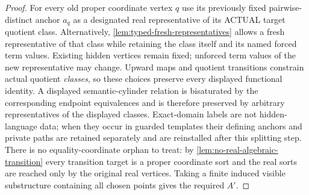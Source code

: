 \begin{proof}
For every old proper coordinate vertex
\(q\) use its previously fixed
pairwise-distinct anchor \(a_q\)
as a designated real representative
of its ACTUAL target quotient class.
Alternatively,
\cref{lem:typed-fresh-representatives}
allows a fresh representative of that class
while retaining the class itself and its
named forced term values. Existing hidden
vertices remain fixed; unforced term values
of the new representative may change.
Upward maps and quotient
transitions constrain actual
quotient \emph{classes}, so these
choices preserve every displayed
functional identity.  A displayed semantic-cylinder relation is bisaturated by the corresponding
endpoint equivalences and is therefore preserved by arbitrary representatives
of the displayed classes.  Exact-domain labels are not hidden-language data;
when they occur in guarded templates their defining anchors and private paths
are retained separately and are reinstalled after this splitting step.  There
is no equality-coordinate orphan to treat: by
\cref{lem:no-real-algebraic-transition} every transition target is a proper
coordinate sort and the real sorts are reached only by the original real
vertices.  Taking a finite induced visible substructure containing all chosen
points gives the required \(A'\).
\end{proof}




